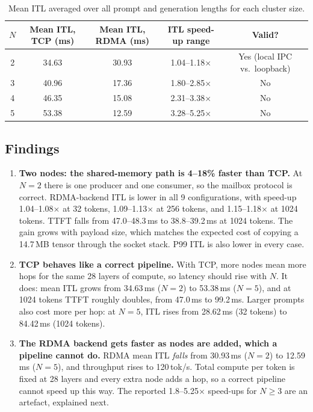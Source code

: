 \documentclass[11pt,a4paper]{article}
\begin{document}
\begin{table}[h]
\centering
\small
\begin{tabular}{@{}ccccc@{}}
\toprule
$N$ & Mean ITL, TCP (ms) & Mean ITL, RDMA (ms) & ITL speed-up range & Valid? \\
\midrule
2 & 34.63 & 30.93 & 1.04--1.18$\times$ & Yes (local IPC vs.\ loopback) \\
3 & 40.96 & 17.36 & 1.80--2.85$\times$ & No \\
4 & 46.35 & 15.08 & 2.31--3.38$\times$ & No \\
5 & 53.38 & 12.59 & 3.28--5.25$\times$ & No \\
\bottomrule
\end{tabular}
\caption{Mean ITL averaged over all prompt and generation lengths for each cluster size.}
\label{tab:byN}
\end{table}

\subsection{Findings}
\begin{enumerate}[leftmargin=*]
  \item \textbf{Two nodes: the shared-memory path is 4--18\% faster than TCP.} At $N=2$ there is one producer and one consumer, so the mailbox protocol is correct. RDMA-backend ITL is lower in all 9 configurations, with speed-up 1.04--1.08$\times$ at 32 tokens, 1.09--1.13$\times$ at 256 tokens, and 1.15--1.18$\times$ at 1024 tokens. TTFT falls from 47.0--48.3\,ms to 38.8--39.2\,ms at 1024 tokens. The gain grows with payload size, which matches the expected cost of copying a 14.7\,MB tensor through the socket stack. P99 ITL is also lower in every case.
  \item \textbf{TCP behaves like a correct pipeline.} With TCP, more nodes mean more hops for the same 28 layers of compute, so latency should rise with $N$. It does: mean ITL grows from 34.63\,ms ($N=2$) to 53.38\,ms ($N=5$), and at 1024 tokens TTFT roughly doubles, from 47.0\,ms to 99.2\,ms. Larger prompts also cost more per hop: at $N=5$, ITL rises from 28.62\,ms (32 tokens) to 84.42\,ms (1024 tokens).
  \item \textbf{The RDMA backend gets faster as nodes are added, which a pipeline cannot do.} RDMA mean ITL \emph{falls} from 30.93\,ms ($N=2$) to 12.59\,ms ($N=5$), and throughput rises to 120\,tok/s. Total compute per token is fixed at 28 layers and every extra node adds a hop, so a correct pipeline cannot speed up this way. The reported 1.8--5.25$\times$ speed-ups for $N \ge 3$ are an artefact, explained next.
\end{enumerate}
\end{document}
